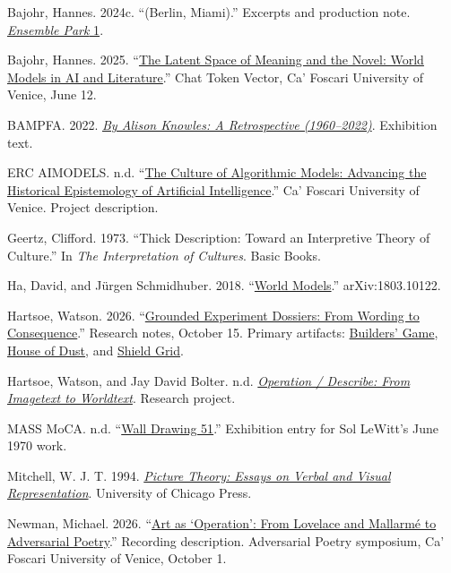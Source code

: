 \documentclass[
  11pt,
  letterpaper,
]{article}
\begin{document}
Bajohr, Hannes. 2024c. ``(Berlin, Miami).'' Excerpts and production
note.
\href{https://www.ensemblepark.com/issues/ensemble_park_1.pdf}{\emph{Ensemble
Park} 1}.

Bajohr, Hannes. 2025.
``\href{https://www.youtube.com/watch?v=hmchpa_Ek20}{The Latent Space of
Meaning and the Novel: World Models in AI and Literature}.'' Chat Token
Vector, Ca' Foscari University of Venice, June 12.

BAMPFA. 2022.
\href{https://bampfa.org/sites/default/files/AlisonKnowles_LargePrint_DIGITAL_v3.pdf}{\emph{By
Alison Knowles: A Retrospective (1960--2022)}}. Exhibition text.

ERC AIMODELS. n.d.
``\href{https://pric.unive.it/projects/ai-models/home}{The Culture of
Algorithmic Models: Advancing the Historical Epistemology of Artificial
Intelligence}.'' Ca' Foscari University of Venice. Project description.

Geertz, Clifford. 1973. ``Thick Description: Toward an Interpretive
Theory of Culture.'' In \emph{The Interpretation of Cultures}. Basic
Books.

Ha, David, and Jürgen Schmidhuber. 2018.
``\href{https://worldmodels.github.io/}{World Models}.''
arXiv:1803.10122.

Hartsoe, Watson. 2026.
``\href{https://chatgpt.com/library?file_id=libfile_6a9f9eac7dfc8191b18354ff8742c3f5\&account_id=personal}{Grounded
Experiment Dossiers: From Wording to Consequence}.'' Research notes,
October 15. Primary artifacts:
\href{https://hartswf0.github.io/tractor-dce-gyo/builders-game.html}{Builders'
Game},
\href{https://hartswf0.github.io/odyssey-halfworld/house-of-dust.html}{House
of Dust}, and
\href{https://hartswf0.github.io/text-ure/shield\%2052/1.html}{Shield
Grid}.

Hartsoe, Watson, and Jay David Bolter. n.d.
\href{https://hartswf0.github.io/operation-describe/}{\emph{Operation /
Describe: From Imagetext to Worldtext}}. Research project.

MASS MoCA. n.d. ``\href{https://massmoca.org/event/walldrawing51/}{Wall
Drawing 51}.'' Exhibition entry for Sol LeWitt's June 1970 work.

Mitchell, W. J. T. 1994.
\href{https://press.uchicago.edu/ucp/books/book/chicago/P/bo3683962.html}{\emph{Picture
Theory: Essays on Verbal and Visual Representation}}. University of
Chicago Press.

Newman, Michael. 2026.
``\href{https://www.youtube.com/watch?v=ce3rNpXdu30}{Art as `Operation':
From Lovelace and Mallarmé to Adversarial Poetry}.'' Recording
description. Adversarial Poetry symposium, Ca' Foscari University of
Venice, October 1.
\end{document}
